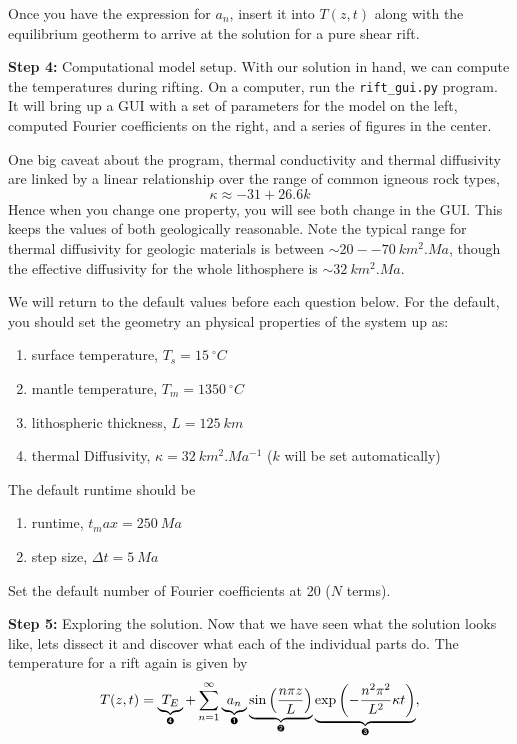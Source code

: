 \documentclass[11pt,a4paper,final]{article}
\begin{document}
\begin{enumerate}
    Once you have the expression for $a_n$, insert it into $T(z,t)$ along with the
    equilibrium geotherm to arrive at the solution for a pure shear rift.



    \vspace{1em}
    {\bf Step 4:} Computational model setup.
    With our solution in hand, we can compute the temperatures during
    rifting.  On a computer, run the \verb+rift_gui.py+ program. It will bring up a GUI with a set of parameters for the model on the left, computed Fourier coefficients on the right, and a series of figures in the center.

    One big caveat about the program, thermal conductivity and thermal diffusivity are linked by a linear relationship over the range of common igneous rock types,
    \[
        \kappa \approx -31 + 26.6 k
    \]
    Hence when you change one property, you will see both change in the GUI. This keeps the values of both geologically reasonable.  Note the typical range for thermal diffusivity for geologic materials is between $\sim 20--\SI{70}{km^2.Ma}$, though the effective diffusivity for the whole lithosphere is $\sim \SI{32}{km^2.Ma}$.

    We will return to the default values before each question below.  For the default, you should set the geometry an physical properties of the system up as:
    \begin{enumerate}
        \item surface temperature, $T_s = \SI{15}{^\circ C}$
        \item mantle temperature, $T_m = \SI{1350}{^\circ C}$
        \item lithospheric thickness, $L = \SI{125}{km}$
        \item thermal Diffusivity, $\kappa = \SI{32}{km^{2}.Ma^{-1}}$ ($k$ will be set automatically)
    \end{enumerate}

    The default runtime should be
    \begin{enumerate}
        \item runtime, $t_max = \SI{250}{Ma}$
        \item step size, $\Delta t = \SI{5}{Ma}$
    \end{enumerate}

    Set the default number of Fourier coefficients at 20 ($N$ terms).

    \vspace{1em}
    {\bf Step 5:} Exploring the solution.
    Now that we have seen what the solution looks like, lets dissect it and discover
    what each of the individual parts do.  The temperature for a rift again is given
    by
    \begin{equation}
    T(z,t) = \underbrace{T_{E}}_\text{\ding{205}} + \sum_{n = 1}^{\infty}
    \underbrace{a_n}_\text{\ding{202}} \underbrace{\sin \left(\frac{n \pi z}{L}
    \right)}_\text{\ding{203}}
    \underbrace{\exp \left(-\frac{n^2 \pi^2}{L^2} \kappa t \right)}_\text{\ding{204}} ,
    \end{equation}
    

\end{enumerate}
\end{document}
